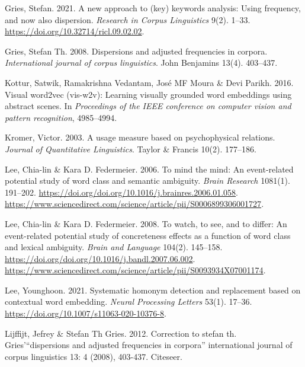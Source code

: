 \documentclass[
]{article}
\newlength{\cslhangindent}
\newlength{\cslentryspacingunit} %
\newenvironment{CSLReferences}[2] %
 {%
  \setlength{\parindent}{0pt}
  \ifodd #1
  \let\oldpar\par
  \def\par{\hangindent=\cslhangindent\oldpar}
  \fi
  \setlength{\parskip}{#2\cslentryspacingunit}
 }%
 {}
\begin{document}
\begin{CSLReferences}{1}{0}
\leavevmode{}%
Gries, Stefan. 2021. A new approach to (key) keywords analysis: Using
frequency, and now also dispersion. \emph{Research in Corpus
Linguistics} 9(2). 1--33. \url{https://doi.org/10.32714/ricl.09.02.02}.

\leavevmode{}%
Gries, Stefan Th. 2008. Dispersions and adjusted frequencies in corpora.
\emph{International journal of corpus linguistics}. John Benjamins
13(4). 403--437.

\leavevmode{}%
Kottur, Satwik, Ramakrishna Vedantam, José MF Moura \& Devi Parikh.
2016. Visual word2vec (vis-w2v): Learning visually grounded word
embeddings using abstract scenes. In \emph{Proceedings of the IEEE
conference on computer vision and pattern recognition}, 4985--4994.

\leavevmode{}%
Kromer, Victor. 2003. A usage measure based on psychophysical relations.
\emph{Journal of Quantitative Linguistics}. Taylor \& Francis 10(2).
177--186.

\leavevmode{}%
Lee, Chia-lin \& Kara D. Federmeier. 2006. To mind the mind: An
event-related potential study of word class and semantic ambiguity.
\emph{Brain Research} 1081(1). 191--202.
\url{https://doi.org/doi.org/10.1016/j.brainres.2006.01.058}.
\url{https://www.sciencedirect.com/science/article/pii/S0006899306001727}.

\leavevmode{}%
Lee, Chia-lin \& Kara D. Federmeier. 2008. To watch, to see, and to
differ: An event-related potential study of concreteness effects as a
function of word class and lexical ambiguity. \emph{Brain and Language}
104(2). 145--158.
\url{https://doi.org/doi.org/10.1016/j.bandl.2007.06.002}.
\url{https://www.sciencedirect.com/science/article/pii/S0093934X07001174}.

\leavevmode{}%
Lee, Younghoon. 2021. Systematic homonym detection and replacement based
on contextual word embedding. \emph{Neural Processing Letters} 53(1).
17--36. \url{https://doi.org/10.1007/s11063-020-10376-8}.

\leavevmode{}%
Lijffijt, Jefrey \& Stefan Th Gries. 2012. Correction to stefan th.
Gries'{``dispersions and adjusted frequencies in corpora''}
international journal of corpus linguistics 13: 4 (2008), 403-437.
Citeseer.


\end{CSLReferences}
\end{document}
